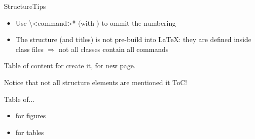 \begin{frame}[fragile]{Structure}{Tips}\relax


\begin{itemize}
    \item Use {\csk \textbackslash<command>*} (with {\Large *}) to ommit the numbering
    \item The structure (and titles) is not pre-build into \LaTeX: they are defined inside class files $\Rightarrow$ not all classes contain all commands
     
\end{itemize}
\end{frame}

\begin{frame}[fragile]{Table of content}\relax
\cprotect{}
     \inpause \ccol{\tableofcontents} for create it, \ccol{\newpage} for new page.
     
     Notice that not all structure elements are mentioned it ToC!

     \cprotect{}
\end{frame}



\begin{frame}[fragile]{Table of...}\relax
\Large
     \begin{itemize}
          \item \ccol{\listoffigures} for figures 
          \item \ccol{\listoftables} for tables 
     \end{itemize}
     
     \cprotect{}
\end{frame}

